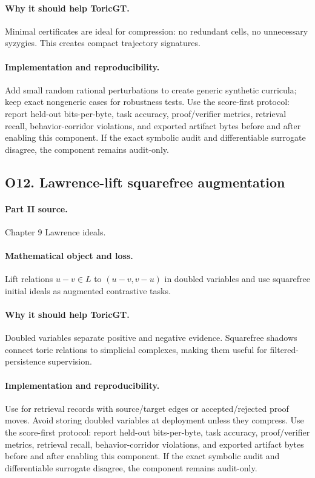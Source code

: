 \documentclass[11pt]{article}
\theoremstyle{definition}
\begin{document}
\paragraph{Why it should help ToricGT.} Minimal certificates are ideal for compression: no redundant cells, no unnecessary syzygies.  This creates compact trajectory signatures.
\paragraph{Implementation and reproducibility.} Add small random rational perturbations to create generic synthetic curricula; keep exact nongeneric cases for robustness tests.  Use the score-first protocol: report held-out bits-per-byte, task accuracy, proof/verifier metrics, retrieval recall, behavior-corridor violations, and exported artifact bytes before and after enabling this component.  If the exact symbolic audit and differentiable surrogate disagree, the component remains audit-only.


\subsection{O12. Lawrence-lift squarefree augmentation}
\paragraph{Part II source.} Chapter 9 Lawrence ideals.
\paragraph{Mathematical object and loss.} Lift relations $u-v\in L$ to $(u-v,v-u)$ in doubled variables and use squarefree initial ideals as augmented contrastive tasks.
\paragraph{Why it should help ToricGT.} Doubled variables separate positive and negative evidence.  Squarefree shadows connect toric relations to simplicial complexes, making them useful for filtered-persistence supervision.
\paragraph{Implementation and reproducibility.} Use for retrieval records with source/target edges or accepted/rejected proof moves.  Avoid storing doubled variables at deployment unless they compress.  Use the score-first protocol: report held-out bits-per-byte, task accuracy, proof/verifier metrics, retrieval recall, behavior-corridor violations, and exported artifact bytes before and after enabling this component.  If the exact symbolic audit and differentiable surrogate disagree, the component remains audit-only.
\end{document}

